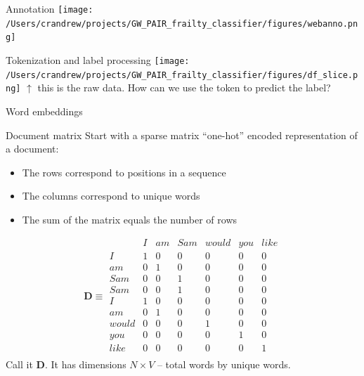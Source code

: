 \documentclass[10pt]{beamer}
\begin{document}
\begin{frame}{Annotation}
\texttt{[image: /Users/crandrew/projects/GW\_PAIR\_frailty\_classifier/figures/webanno.png]}
\end{frame}

\begin{frame}{Tokenization and label processing}
\texttt{[image: /Users/crandrew/projects/GW\_PAIR\_frailty\_classifier/figures/df\_slice.png]}
$\uparrow$ this is the raw data.  How can we use the token to predict the label?
\end{frame}

\begin{frame}
\huge{Word embeddings}
\end{frame}


\begin{frame}{Document matrix}
Start with a sparse matrix ``one-hot'' encoded representation of a document:
\begin{itemize}
	\item The rows correspond to positions in a sequence
	\item The columns correspond to unique words
	\item The sum of the matrix equals the number of rows
\end{itemize}
\[  \bm{D} \equiv
\begin{array}{c|cccccc}
     & I & am & Sam & would & you & like \\
     \hline
I    & 1 & 0  & 0   & 0     & 0   &  0 \\
am   & 0 & 1  & 0   & 0     & 0   &  0 \\
Sam  & 0 & 0  & 1   & 0     & 0   &  0 \\
Sam  & 0 & 0  & 1   & 0     & 0   &  0 \\
I    & 1 & 0  & 0   & 0     & 0   &  0 \\
am   & 0 & 1  & 0   & 0     & 0   &  0 \\
would& 0 & 0  & 0   & 1     & 0   &  0 \\
you  & 0 & 0  & 0   & 0     & 1   &  0 \\
like & 0 & 0  & 0   & 0     & 0   &  1 \\
\end{array}\] 
Call it $\bm{D}$.  It has dimensions $N\times V$ -- total words by unique words.
\end{frame}
\end{document}
